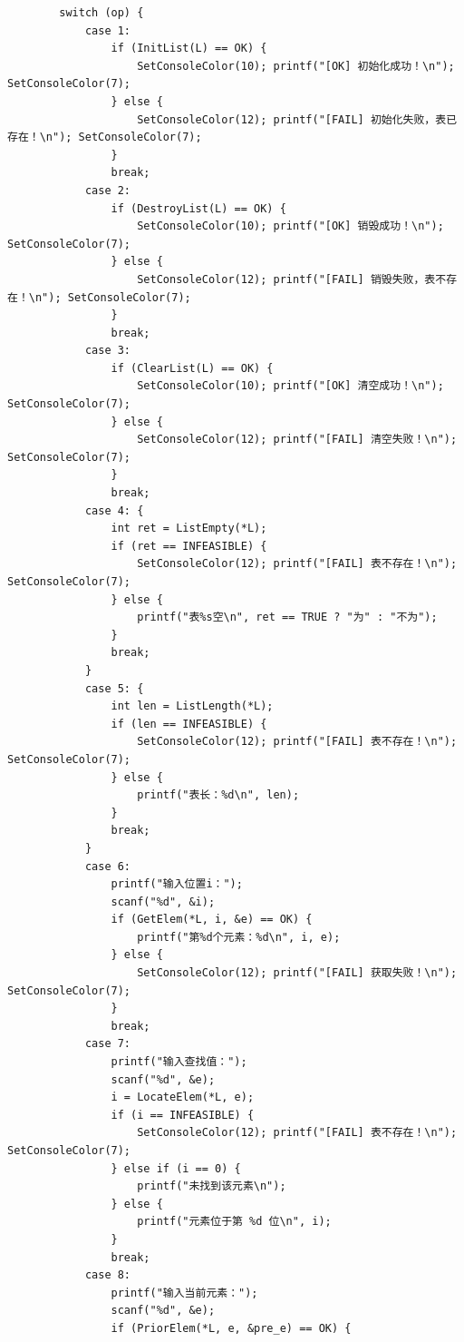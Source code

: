\documentclass[supercite]{Experimental_Report}
\begin{document}
{\begin{lstlisting}
        switch (op) {
            case 1:
                if (InitList(L) == OK) {
                    SetConsoleColor(10); printf("[OK] 初始化成功！\n"); SetConsoleColor(7);
                } else {
                    SetConsoleColor(12); printf("[FAIL] 初始化失败，表已存在！\n"); SetConsoleColor(7);
                }
                break;
            case 2:
                if (DestroyList(L) == OK) {
                    SetConsoleColor(10); printf("[OK] 销毁成功！\n"); SetConsoleColor(7);
                } else {
                    SetConsoleColor(12); printf("[FAIL] 销毁失败，表不存在！\n"); SetConsoleColor(7);
                }
                break;
            case 3:
                if (ClearList(L) == OK) {
                    SetConsoleColor(10); printf("[OK] 清空成功！\n"); SetConsoleColor(7);
                } else {
                    SetConsoleColor(12); printf("[FAIL] 清空失败！\n"); SetConsoleColor(7);
                }
                break;
            case 4: {
                int ret = ListEmpty(*L);
                if (ret == INFEASIBLE) {
                    SetConsoleColor(12); printf("[FAIL] 表不存在！\n"); SetConsoleColor(7);
                } else {
                    printf("表%s空\n", ret == TRUE ? "为" : "不为");
                }
                break;
            }
            case 5: {
                int len = ListLength(*L);
                if (len == INFEASIBLE) {
                    SetConsoleColor(12); printf("[FAIL] 表不存在！\n"); SetConsoleColor(7);
                } else {
                    printf("表长：%d\n", len);
                }
                break;
            }
            case 6:
                printf("输入位置i：");
                scanf("%d", &i);
                if (GetElem(*L, i, &e) == OK) {
                    printf("第%d个元素：%d\n", i, e);
                } else {
                    SetConsoleColor(12); printf("[FAIL] 获取失败！\n"); SetConsoleColor(7);
                }
                break;
            case 7:
                printf("输入查找值：");
                scanf("%d", &e);
                i = LocateElem(*L, e);
                if (i == INFEASIBLE) {
                    SetConsoleColor(12); printf("[FAIL] 表不存在！\n"); SetConsoleColor(7);
                } else if (i == 0) {
                    printf("未找到该元素\n");
                } else {
                    printf("元素位于第 %d 位\n", i);
                }
                break;
            case 8:
                printf("输入当前元素：");
                scanf("%d", &e);
                if (PriorElem(*L, e, &pre_e) == OK) {

\end{lstlisting}}
\end{document}
